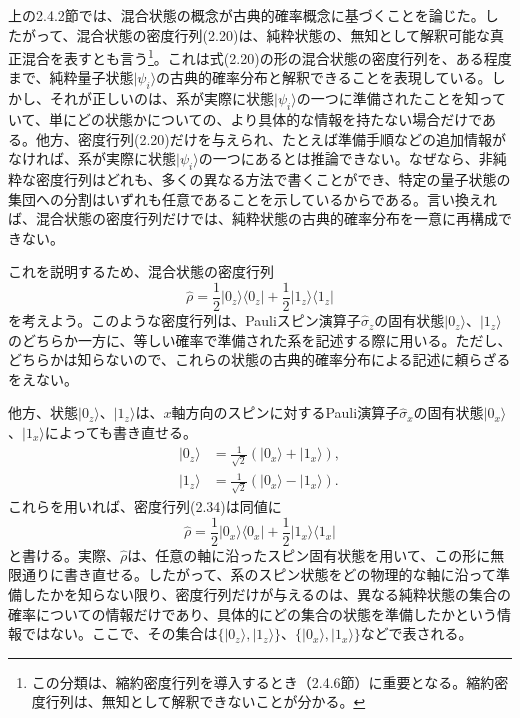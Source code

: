 上の2.4.2節では、混合状態の概念が古典的確率概念に基づくことを論じた。したがって、混合状態の密度行列(2.20)は、純粋状態の、無知として解釈可能な真正混合を表すとも言う\cite{ref047,ref048,ref049}\footnote{この分類は、縮約密度行列を導入するとき（2.4.6節）に重要となる。縮約密度行列は、無知として解釈できないことが分かる。}。これは式(2.20)の形の混合状態の密度行列を、ある程度まで、純粋量子状態$\lvert\psi_i\rangle$の古典的確率分布と解釈できることを表現している。しかし、それが正しいのは、系が実際に状態$\lvert\psi_i\rangle$の一つに準備されたことを知っていて、単にどの状態かについての、より具体的な情報を持たない場合だけである。他方、密度行列(2.20)だけを与えられ、たとえば準備手順などの追加情報がなければ、系が実際に状態$\lvert\psi_i\rangle$の一つにあるとは推論できない。なぜなら、非純粋な密度行列はどれも、多くの異なる方法で書くことができ、特定の量子状態の集団への分割はいずれも任意であることを示しているからである。言い換えれば、混合状態の密度行列だけでは、純粋状態の古典的確率分布を一意に再構成できない。

\hypertarget{srcpage:42}{}\label{srcpage:42}
これを説明するため、混合状態の密度行列
\begin{equation}\hat\rho=\frac12\lvert0_z\rangle\langle0_z\rvert+\frac12\lvert1_z\rangle\langle1_z\rvert\tag{2.34}\end{equation}
を考えよう。このような密度行列は、Pauliスピン演算子$\hat\sigma_z$の固有状態$\lvert0_z\rangle$、$\lvert1_z\rangle$のどちらか一方に、等しい確率で準備された系を記述する際に用いる。ただし、どちらかは知らないので、これらの状態の古典的確率分布による記述に頼らざるをえない。

他方、状態$\lvert0_z\rangle$、$\lvert1_z\rangle$は、$x$軸方向のスピンに対するPauli演算子$\hat\sigma_x$の固有状態$\lvert0_x\rangle$、$\lvert1_x\rangle$によっても書き直せる。
\begin{equation}\begin{split}\lvert0_z\rangle&=\frac1{\sqrt2}(\lvert0_x\rangle+\lvert1_x\rangle),\\\lvert1_z\rangle&=\frac1{\sqrt2}(\lvert0_x\rangle-\lvert1_x\rangle).\end{split}\tag{2.35}\end{equation}
これらを用いれば、密度行列(2.34)は同値に
\begin{equation}\hat\rho=\frac12\lvert0_x\rangle\langle0_x\rvert+\frac12\lvert1_x\rangle\langle1_x\rvert\tag{2.36}\end{equation}
と書ける。実際、$\hat\rho$は、任意の軸に沿ったスピン固有状態を用いて、この形に無限通りに書き直せる。したがって、系のスピン状態をどの物理的な軸に沿って準備したかを知らない限り、密度行列だけが与えるのは、異なる純粋状態の集合の確率についての情報だけであり、具体的にどの集合の状態を準備したかという情報ではない。ここで、その集合は$\{\lvert0_z\rangle,\lvert1_z\rangle\}$、$\{\lvert0_x\rangle,\lvert1_x\rangle\}$などで表される。

